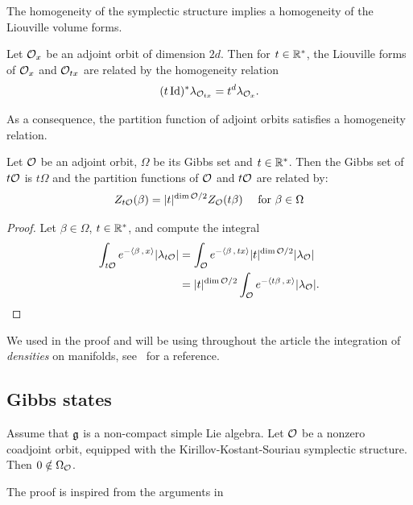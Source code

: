 \documentclass[english]{article}
\begin{document}
The homogeneity of the symplectic structure implies a homogeneity of the Liouville volume forms.
\begin{corollary}\label{corno:LiouvilleHomogene}
    Let $\mathcal{O}_x$ be an adjoint orbit of dimension $2d$. Then for $t\in \mathbb{R}^*$, the Liouville forms of $\mathcal{O}_x$ and $\mathcal{O}_{tx}$ are related by the homogeneity relation
    \[
        (t \operatorname{Id})^* \lambda_{\mathcal{O}_{tx}} = t^d \lambda_{\mathcal{O}_x}.
    \]
\end{corollary}

As a consequence, the partition function of adjoint orbits satisfies a homogeneity relation.
\begin{corollary}\label{corno:ZHomogene}
    Let $\mathcal{O}$ be an adjoint orbit, $\Omega$ be its Gibbs set and $t\in \mathbb{R}^*$.
    Then the Gibbs set of $t \mathcal{O}$ is $t \Omega$ and the partition functions of $\mathcal{O}$ and $t\mathcal{O}$ are related by:
    \[
        Z_{t\mathcal{O}}(\beta) = |t|^{\dim \mathcal{O} /2} Z_{\mathcal{O}}(t\beta) 
        \quad \text{ for }\beta \in \Omega
    \]
\end{corollary}
\begin{proof}
    Let $\beta\in \Omega$, $t\in \mathbb{R}^*$, and compute the integral
    \begin{equation*}
        \begin{aligned}
            \int_{t\mathcal{O}} e^{-\left\langle \beta \,,\, x \right\rangle} |\lambda_{t\mathcal{O}}|
            &= \int_{\mathcal{O}} e^{-\left\langle \beta \,,\, tx \right\rangle} |t|^{\dim \mathcal{O}/2}|\lambda_{\mathcal{O}}|\\
            &= |t|^{\dim \mathcal{O}/2} \int_{\mathcal{O}} e^{-\left\langle t\beta \,,\, x \right\rangle} |\lambda_{\mathcal{O}}|
        .\end{aligned}
    \end{equation*}
\end{proof}
We used in the proof and will be using throughout the article the integration of \emph{densities} on manifolds, see~\cite[Ch. 6]{SemiClassicalAnalysis} for a reference.

\subsection{Gibbs states}

\begin{proposition}\label{propno:noncompactGenTemp}
    Assume that $\mathfrak g$ is a non-compact simple Lie algebra.
    Let $\mathcal{O}$ be a nonzero coadjoint orbit, equipped with the Kirillov-Kostant-Souriau symplectic structure. 
    Then $0 \notin \Omega_{\mathcal{O}}$.
\end{proposition}
The proof is inspired from the arguments in~\cite{CompactCoadjointOrbits}
\end{document}
